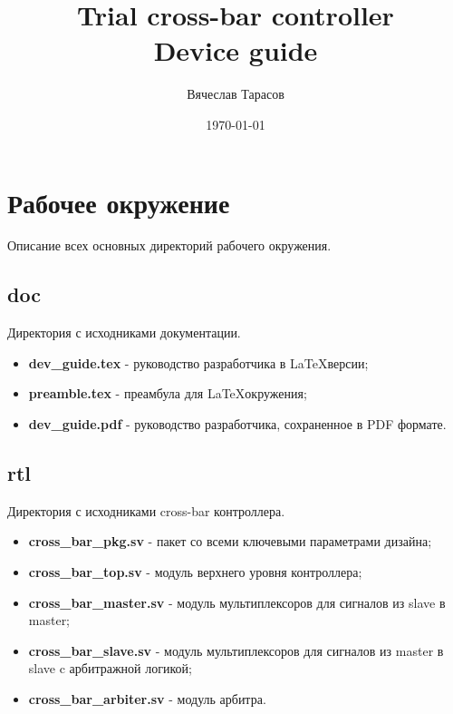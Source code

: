 \documentclass[a4paper, 10pt]{article}
\author{Вячеслав Тарасов}
\title{ Trial cross-bar controller\\
        Device guide}
\date{\today}
\begin{document}
\maketitle
\thispagestyle{empty}
\newpage

\tableofcontents
\pagestyle{myheadings}
\pagestyle{fancy}
\fancyhf{}
\setlength{\headheight}{30pt}
\renewcommand{\headrulewidth}{4pt}
\renewcommand{\footrulewidth}{2pt}
\fancyhead[R]{\leftmark}
\fancyfoot[C]{\thepage}

\newpage
\section{Рабочее окружение}

Описание всех основных директорий рабочего окружения.

\subsection{doc}

Директория с исходниками документации.
\begin{itemize}
 \item \textbf{dev\_guide.tex} - руководство разработчика в \LaTeX версии;
 \item \textbf{preamble.tex} - преамбула для \LaTeX окружения;
 \item \textbf{dev\_guide.pdf} - руководство разработчика, сохраненное в PDF формате.
\end{itemize}

\subsection{rtl}

Директория с исходниками cross-bar контроллера.
\begin{itemize}
 \item \textbf{cross\_bar\_pkg.sv} - пакет со всеми ключевыми параметрами дизайна;
 \item \textbf{cross\_bar\_top.sv} - модуль верхнего уровня контроллера;
 \item \textbf{cross\_bar\_master.sv} - модуль мультиплексоров для сигналов из slave в master;
 \item \textbf{cross\_bar\_slave.sv} - модуль мультиплексоров для сигналов из master в slave c арбитражной логикой;
 \item \textbf{cross\_bar\_arbiter.sv} - модуль арбитра.
\end{itemize}
\end{document}
